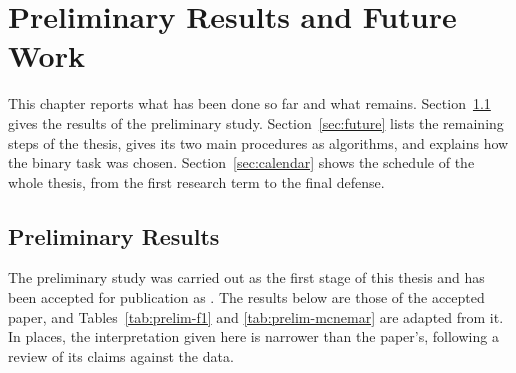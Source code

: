 %
%
%

\chapter{Preliminary Results and Future Work}
\label{sec:prelimfuture}

This chapter reports what has been done so far and what remains. Section~\ref{sec:prelim} gives the results of the preliminary study. Section~\ref{sec:future} lists the remaining steps of the thesis, gives its two main procedures as algorithms, and explains how the binary task was chosen. Section~\ref{sec:calendar} shows the schedule of the whole thesis, from the first research term to the final defense.



\section{Preliminary Results}
\label{sec:prelim}

The preliminary study was carried out as the first stage of this thesis and has been accepted for publication as . The results below are those of the accepted paper, and Tables~\ref{tab:prelim-f1} and \ref{tab:prelim-mcnemar} are adapted from it. In places, the interpretation given here is narrower than the paper's, following a review of its claims against the data.

